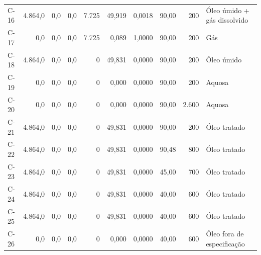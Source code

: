 \documentclass[11pt,a4paper]{article}
\numberwithin{equation}{section}
\numberwithin{table}{section}
\numberwithin{figure}{section}
\begin{document}
{\begin{longtable}{lrrrrrrrrL{2.5cm}}
C-16 & 4.864,0 & 0,0 & 0,0 & 7.725 & 49,919 & 0,0018 & 90,00 & 200 & {\scriptsize Óleo úmido + gás dissolvido}\\
C-17 & 0,0 & 0,0 & 0,0 & 7.725 & 0,089 & 1,0000 & 90,00 & 200 & {\scriptsize Gás}\\
C-18 & 4.864,0 & 0,0 & 0,0 & 0 & 49,831 & 0,0000 & 90,00 & 200 & {\scriptsize Óleo úmido}\\
C-19 & 0,0 & 0,0 & 0,0 & 0 & 0,000 & 0,0000 & 90,00 & 200 & {\scriptsize Aquosa}\\
C-20 & 0,0 & 0,0 & 0,0 & 0 & 0,000 & 0,0000 & 90,00 & 2.600 & {\scriptsize Aquosa}\\
C-21 & 4.864,0 & 0,0 & 0,0 & 0 & 49,831 & 0,0000 & 90,00 & 200 & {\scriptsize Óleo tratado}\\
C-22 & 4.864,0 & 0,0 & 0,0 & 0 & 49,831 & 0,0000 & 90,48 & 800 & {\scriptsize Óleo tratado}\\
C-23 & 4.864,0 & 0,0 & 0,0 & 0 & 49,831 & 0,0000 & 45,00 & 700 & {\scriptsize Óleo tratado}\\
C-24 & 4.864,0 & 0,0 & 0,0 & 0 & 49,831 & 0,0000 & 40,00 & 600 & {\scriptsize Óleo tratado}\\
C-25 & 4.864,0 & 0,0 & 0,0 & 0 & 49,831 & 0,0000 & 40,00 & 600 & {\scriptsize Óleo tratado}\\
C-26 & 0,0 & 0,0 & 0,0 & 0 & 0,000 & 0,0000 & 40,00 & 600 & {\scriptsize Óleo fora de especificação}\\
\bottomrule\end{longtable}}
\end{document}

